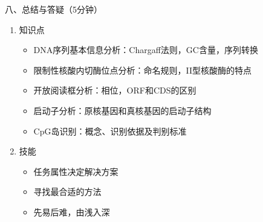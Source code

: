 \documentclass{TIJMUjiaoanLL}
\begin{document}
\vspace*{0.2cm}
\noindent
八、总结与答疑（5分钟）
\begin{enumerate}
  \item 知识点
    \begin{itemize}
      \item DNA序列基本信息分析：Chargaff法则，GC含量，序列转换
      \item 限制性核酸内切酶位点分析：命名规则，II型核酸酶的特点
      \item 开放阅读框分析：相位，ORF和CDS的区别
      \item 启动子分析：原核基因和真核基因的启动子结构
      \item CpG岛识别：概念、识别依据及判别标准
    \end{itemize}
  \item 技能
    \begin{itemize}
      \item 任务属性决定解决方案
      \item 寻找最合适的方法
      \item 先易后难，由浅入深
    \end{itemize}
\end{enumerate}


\otherTail
\end{document}
